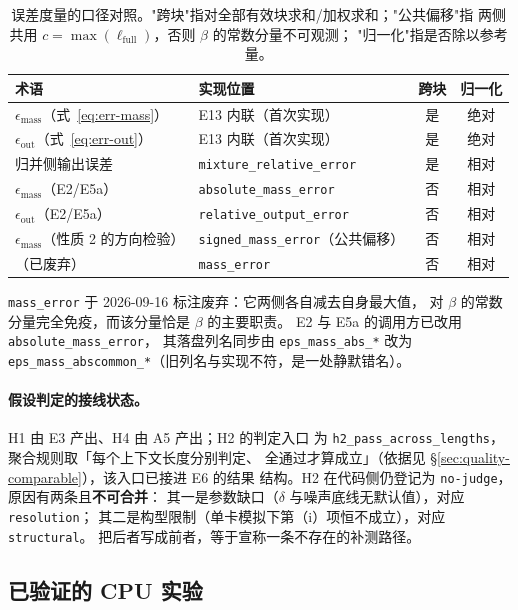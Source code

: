 \begin{table}[t]
\centering
\small
\caption{误差度量的口径对照。"跨块"指对全部有效块求和/加权求和；"公共偏移"指
两侧共用 $c=\max(\ell_{\text{full}})$，否则 $\beta$ 的常数分量不可观测；
"归一化"指是否除以参考量。}
\label{tab:metrics}
\begin{tabular}{@{}p{}p{}cc@{}}
\toprule
术语 & 实现位置 & 跨块 & 归一化 \\
\midrule
$\epsilon_{\text{mass}}$（式~\eqref{eq:err-mass}） & E13 内联（首次实现） & 是 & 绝对 \\
$\epsilon_{\text{out}}$（式~\eqref{eq:err-out}） & E13 内联（首次实现） & 是 & 绝对 \\
归并侧输出误差 & \texttt{mixture\_relative\_error} & 是 & 相对 \\
$\epsilon_{\text{mass}}$（E2/E5a） & \texttt{absolute\_mass\_error} & 否 & 相对 \\
$\epsilon_{\text{out}}$（E2/E5a） & \texttt{relative\_output\_error} & 否 & 相对 \\
$\epsilon_{\text{mass}}$（性质 2 的方向检验） & \texttt{signed\_mass\_error}（公共偏移） & 否 & 相对 \\
（已废弃） & \texttt{mass\_error} & 否 & 相对 \\
\bottomrule
\end{tabular}
\end{table}

\texttt{mass\_error} 于 2026-09-16 标注废弃：它两侧各自减去自身最大值，
对 $\beta$ 的常数分量完全免疫，而该分量恰是 $\beta$ 的主要职责。
E2 与 E5a 的调用方已改用 \texttt{absolute\_mass\_error}，
其落盘列名同步由 \texttt{eps\_mass\_abs\_*} 改为
\texttt{eps\_mass\_abscommon\_*}（旧列名与实现不符，是一处静默错名）。

\paragraph{假设判定的接线状态。}H1 由 E3 产出、H4 由 A5 产出；H2 的判定入口
为 \texttt{h2\_pass\_across\_lengths}，聚合规则取「每个上下文长度分别判定、
全通过才算成立」（依据见 \S\ref{sec:quality-comparable}），该入口已接进 E6 的结果
结构。H2 在代码侧仍登记为 \texttt{no-judge}，原因有两条且\textbf{不可合并}：
其一是参数缺口（$\delta$ 与噪声底线无默认值），对应 \texttt{resolution}；
其二是构型限制（单卡模拟下第（i）项恒不成立），对应 \texttt{structural}。
把后者写成前者，等于宣称一条不存在的补测路径。

\subsection{已验证的 CPU 实验}
\label{sec:exp-cpu}


